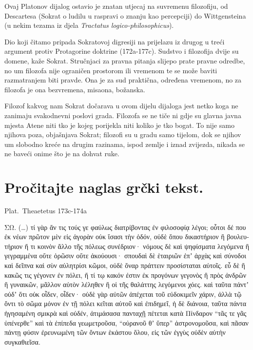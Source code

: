 Ovaj Platonov dijalog ostavio je znatan utjecaj na suvremenu filozofiju, od Descartesa (Sokrat o ludilu u raspravi o znanju kao percepciji) do Wittgensteina (u nekim tezama iz djela \textit{Tractatus logico-philosophicus}).

Dio koji čitamo pripada Sokratovoj digresiji na prijelazu iz drugog u treći argument protiv Protagorine doktrine (172a-177c). Sudstvo i filozofija dvije su domene, kaže Sokrat. Stručnjaci za pravna pitanja slijepo prate pravne odredbe, no um filozofa nije ograničen prostorom ili vremenom te se može baviti razmatranjem biti pravde. Ona je za sud praktična, određena vremenom, no za filozofa je ona bezvremena, misaona, božanska. 

Filozof kakvog nam Sokrat dočarava u ovom dijelu dijaloga jest netko koga ne zanimaju svakodnevni poslovi grada. Filozofa se ne tiče ni gdje su glavna javna mjesta Atene niti tko je kojeg porijekla niti koliko je tko bogat. To nije samo njihova poza, objašnjava Sokrat; filozofi su u gradu samo tijelom, dok se njihov um slobodno kreće na drugim razinama, ispod zemlje i iznad zvijezda, nikada se ne baveći onime što je na dohvat ruke.


\newpage

\section*{Pročitajte naglas grčki tekst.}

Plat.\ Theaetetus 173c-174a


\medskip


{\large

\begin{greek}

\noindent ΣΩ. (\dots) τί γὰρ ἄν τις τούς γε φαύλως διατρίβοντας ἐν φιλοσοφίᾳ λέγοι; οὗτοι δέ που ἐκ νέων πρῶτον μὲν εἰς ἀγορὰν οὐκ ἴσασι τὴν ὁδόν, οὐδὲ ὅπου δικαστήριον ἢ βουλευτήριον ἤ τι κοινὸν ἄλλο τῆς πόλεως συνέδριον· νόμους δὲ καὶ ψηφίσματα λεγόμενα ἢ γεγραμμένα οὔτε ὁρῶσιν οὔτε ἀκούουσι· σπουδαὶ δὲ ἑταιριῶν ἐπʼ ἀρχὰς καὶ σύνοδοι καὶ δεῖπνα καὶ σὺν αὐλητρίσι κῶμοι, οὐδὲ ὄναρ πράττειν προσίσταται αὐτοῖς. εὖ δὲ ἢ κακῶς τις γέγονεν ἐν πόλει, ἤ τί τῳ κακόν ἐστιν ἐκ προγόνων γεγονὸς ἢ πρὸς ἀνδρῶν ἢ γυναικῶν, μᾶλλον αὐτὸν λέληθεν ἢ οἱ τῆς θαλάττης λεγόμενοι χόες. καὶ ταῦτα πάντʼ οὐδʼ ὅτι οὐκ οἶδεν, οἶδεν· οὐδὲ γὰρ αὐτῶν ἀπέχεται τοῦ εὐδοκιμεῖν χάριν, ἀλλὰ τῷ ὄντι τὸ σῶμα μόνον ἐν τῇ πόλει κεῖται αὐτοῦ καὶ ἐπιδημεῖ, ἡ δὲ διάνοια, ταῦτα πάντα ἡγησαμένη σμικρὰ καὶ οὐδέν, ἀτιμάσασα πανταχῇ πέτεται κατὰ Πίνδαρον ``τᾶς τε γᾶς ὑπένερθε'' καὶ τὰ ἐπίπεδα γεωμετροῦσα, ``οὐρανοῦ θʼ ὕπερ'' ἀστρονομοῦσα, καὶ πᾶσαν πάντῃ φύσιν ἐρευνωμένη τῶν ὄντων ἑκάστου ὅλου, εἰς τῶν ἐγγὺς οὐδὲν αὑτὴν συγκαθιεῖσα.

\end{greek}

}


